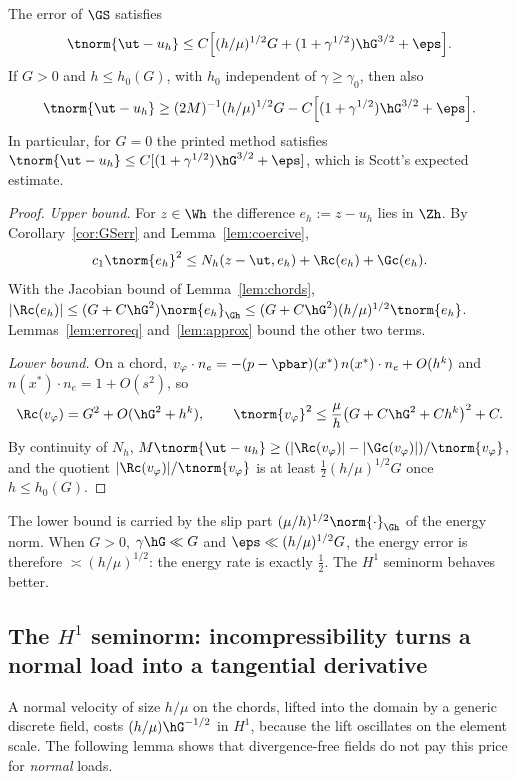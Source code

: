 \begin{theorem}\label{thm:A}
The error of $\GS$ satisfies
\[
\tnorm{\ut-u_h}\le C\Bigl[(h/\mu)^{1/2}G+(1+\gamma^{1/2})\hG^{3/2}+\eps\Bigr].
\]
If $G>0$ and $h\le h_0(G)$, with $h_0$ independent of $\gamma\ge\gamma_0$, then also
\[
\tnorm{\ut-u_h}\ge(2M)^{-1}(h/\mu)^{1/2}G-C\Bigl[(1+\gamma^{1/2})\hG^{3/2}+\eps\Bigr].
\]
In particular, for $G=0$ the printed method satisfies $\tnorm{\ut-u_h}\le C[(1+\gamma^{1/2})\hG^{3/2}+\eps]$, which is Scott's expected estimate.
\end{theorem}

\begin{proof}
\emph{Upper bound.} For $z\in\Wh$ the difference $e_h:=z-u_h$ lies in $\Zh$. By Corollary~\ref{cor:GSerr} and Lemma~\ref{lem:coercive},
\[
c_1\tnorm{e_h}^2\le N_h(z-\ut,e_h)+\Rc(e_h)+\Gc(e_h).
\]
With the Jacobian bound of Lemma~\ref{lem:chords}, $|\Rc(e_h)|\le(G+C\hG^2)\norm{e_h}_{\Gh}\le(G+C\hG^2)(h/\mu)^{1/2}\tnorm{e_h}$. Lemmas~\ref{lem:erroreq} and~\ref{lem:approx} bound the other two terms.

\emph{Lower bound.} On a chord, $v_\varphi\cdot n_e=-(p-\pbar)(x^\ast)\,n(x^\ast)\cdot n_e+O(h^k)$ and $n(x^\ast)\cdot n_e=1+O(s^2)$, so
\[
\Rc(v_\varphi)=G^2+O(\hG^2+h^k),\qquad \tnorm{v_\varphi}^2\le\frac\mu h\bigl(G+C\hG^2+Ch^k\bigr)^2+C .
\]
By continuity of $N_h$, $M\tnorm{\ut-u_h}\ge(|\Rc(v_\varphi)|-|\Gc(v_\varphi)|)/\tnorm{v_\varphi}$, and the quotient $|\Rc(v_\varphi)|/\tnorm{v_\varphi}$ is at least $\frac12(h/\mu)^{1/2}G$ once $h\le h_0(G)$.
\end{proof}

The lower bound is carried by the slip part $(\mu/h)^{1/2}\norm{\cdot}_{\Gh}$ of the energy norm. When $G>0$, $\gamma\hG\ll G$ and $\eps\ll(h/\mu)^{1/2}G$, the energy error is therefore $\asymp(h/\mu)^{1/2}$: the energy rate is exactly $\frac12$. The $H^1$ seminorm behaves better.

\subsection{The \texorpdfstring{$H^1$}{H1} seminorm: incompressibility turns a normal load into a tangential derivative}
A normal velocity of size $h/\mu$ on the chords, lifted into the domain by a generic discrete field, costs $(h/\mu)\hG^{-1/2}$ in $H^1$, because the lift oscillates on the element scale. The following lemma shows that divergence-free fields do not pay this price for \emph{normal} loads.


